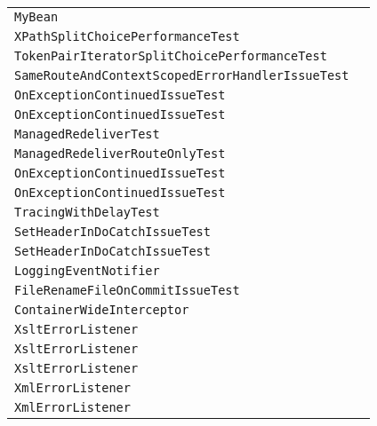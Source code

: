 \begin{center}
\begin{tabular}{ll}
\lstinline/MyBean/&\raisebox{0pt}{\lstinline/invoke(List<String>strList)/}\\
\lstinline/XPathSplitChoicePerformanceTest/&\raisebox{0pt}{\lstinline/process(Exchange)/}\\
\lstinline/TokenPairIteratorSplitChoicePerformanceTest/&\raisebox{0pt}{\lstinline/process(Exchange)/}\\
\lstinline/SameRouteAndContextScopedErrorHandlerIssueTest/&\raisebox{0pt}{\lstinline/process(Exchange)/}\\
\lstinline/OnExceptionContinuedIssueTest/&\raisebox{0pt}{\lstinline/process(Exchange)/}\\
\lstinline/OnExceptionContinuedIssueTest/&\raisebox{0pt}{\lstinline/process(Exchange)/}\\
\lstinline/ManagedRedeliverTest/&\raisebox{0pt}{\lstinline/process(Exchange)/}\\
\lstinline/ManagedRedeliverRouteOnlyTest/&\raisebox{0pt}{\lstinline/process(Exchange)/}\\
\lstinline/OnExceptionContinuedIssueTest/&\raisebox{0pt}{\lstinline/process(Exchange)/}\\
\lstinline/OnExceptionContinuedIssueTest/&\raisebox{0pt}{\lstinline/process(Exchange)/}\\
\lstinline/TracingWithDelayTest/&\raisebox{0pt}{\lstinline/process(Exchange)/}\\
\lstinline/SetHeaderInDoCatchIssueTest/&\raisebox{0pt}{\lstinline/process(Exchange)/}\\
\lstinline/SetHeaderInDoCatchIssueTest/&\raisebox{0pt}{\lstinline/process(Exchange)/}\\
\lstinline/LoggingEventNotifier/&\raisebox{0pt}{\lstinline/notify(event)/}\\
\lstinline/FileRenameFileOnCommitIssueTest/&\raisebox{0pt}{\lstinline/process(Exchange)/}\\
\lstinline/ContainerWideInterceptor/&\raisebox{0pt}{\lstinline/process(Exchange)/}\\
\lstinline/XsltErrorListener/&\raisebox{0pt}{\lstinline/fatalError(TransformerException)/}\\
\lstinline/XsltErrorListener/&\raisebox{0pt}{\lstinline/error(TransformerException)/}\\
\lstinline/XsltErrorListener/&\raisebox{0pt}{\lstinline/warning(TransformerException)/}\\
\lstinline/XmlErrorListener/&\raisebox{0pt}{\lstinline/fatalError(TransformerException)/}\\
\lstinline/XmlErrorListener/&\raisebox{0pt}{\lstinline/error(TransformerException)/}\\

\end{tabular}
\end{center}
